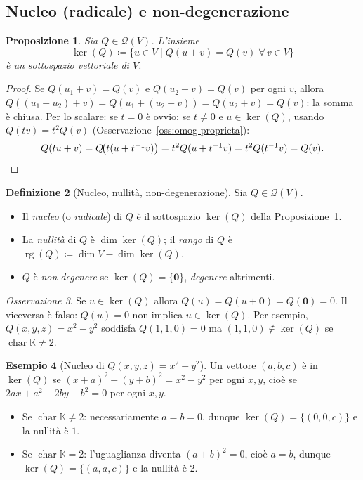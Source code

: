 \documentclass[11pt, a4paper]{book}
\theoremstyle{definition}
\newtheorem{definizione}{Definizione}[section]
\newtheorem{esempio}[definizione]{Esempio}
\theoremstyle{plain}
\newtheorem{proposizione}[definizione]{Proposizione}
\theoremstyle{remark}
\newtheorem{osservazione}[definizione]{Osservazione}
\newcommand{\K}{\mathbb{K}}
\DeclareMathOperator{\car}{char}
\DeclareMathOperator{\rg}{rg}
\begin{document}
\subsection{Nucleo (radicale) e non-degenerazione}

\begin{proposizione}
\label{prop:nucleo-qf-sott}
Sia $Q \in \mathcal{Q}(V)$. L'insieme
\[
  \ker(Q) \coloneqq \{ u \in V \mid Q(u + v) = Q(v)\;\forall\, v \in V \}
\]
è un sottospazio vettoriale di $V$.
\end{proposizione}

\begin{proof}
Se $Q(u_1+v) = Q(v)$ e $Q(u_2+v) = Q(v)$ per ogni $v$, allora $Q((u_1+u_2)+v) = Q(u_1+(u_2+v)) = Q(u_2+v) = Q(v)$: la somma è chiusa. Per lo scalare: se $t = 0$ è ovvio; se $t \neq 0$ e $u \in \ker(Q)$, usando $Q(tv) = t^2Q(v)$ (Osservazione~\ref{oss:omog-proprieta}):
\[
  Q(tu+v) = Q\!\bigl(t(u+t^{-1}v)\bigr) = t^2 Q(u+t^{-1}v) = t^2 Q(t^{-1}v) = Q(v). \qedhere
\]
\end{proof}

\begin{defbox}
\begin{definizione}[Nucleo, nullità, non-degenerazione]
\label{def:nucleo-nondeg}
Sia $Q \in \mathcal{Q}(V)$.
\begin{itemize}
  \item Il \emph{nucleo} (o \emph{radicale}) di $Q$ è il sottospazio $\ker(Q)$ della Proposizione~\ref{prop:nucleo-qf-sott}.
  \item La \emph{nullità} di $Q$ è $\dim\ker(Q)$; il \emph{rango} di $Q$ è $\rg(Q) \coloneqq \dim V - \dim\ker(Q)$.
  \item $Q$ è \emph{non degenere} se $\ker(Q) = \{\mathbf{0}\}$, \emph{degenere} altrimenti.
\end{itemize}
\end{definizione}
\end{defbox}

\begin{osservazione}
\label{oss:ker-ne-zero}
Se $u \in \ker(Q)$ allora $Q(u) = Q(u+\mathbf{0}) = Q(\mathbf{0}) = 0$. Il viceversa è falso: $Q(u)=0$ non implica $u \in \ker(Q)$. Per esempio, $Q(x,y,z) = x^2-y^2$ soddisfa $Q(1,1,0)=0$ ma $(1,1,0) \notin \ker(Q)$ se $\car\K\neq 2$.
\end{osservazione}

\begin{exbox}
\begin{esempio}[Nucleo di $Q(x,y,z) = x^2-y^2$]
\label{es:nucleo-x2y2}
Un vettore $(a,b,c)$ è in $\ker(Q)$ se $(x+a)^2-(y+b)^2 = x^2-y^2$ per ogni $x,y$, cioè se $2ax+a^2-2by-b^2 = 0$ per ogni $x,y$.
\begin{itemize}
  \item Se $\car\K \neq 2$: necessariamente $a = b = 0$, dunque $\ker(Q) = \{(0,0,c)\}$ e la nullità è $1$.
  \item Se $\car\K = 2$: l'uguaglianza diventa $(a+b)^2 = 0$, cioè $a = b$, dunque $\ker(Q) = \{(a,a,c)\}$ e la nullità è $2$.
\end{itemize}
\end{esempio}
\end{exbox}
\end{document}
